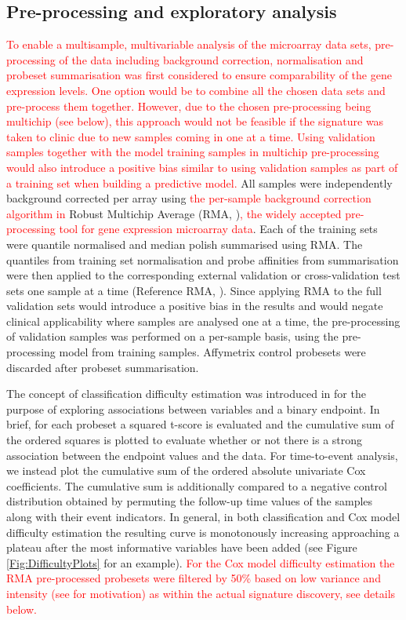 \documentclass[letterpaper,12pt]{article}
\begin{document}
\subsection{Pre-processing and exploratory analysis}
\textcolor{red}{To enable a multisample, multivariable analysis of the microarray data sets, pre-processing of the data including background correction, normalisation and probeset summarisation was first considered to ensure comparability of the gene expression levels. One option would be to combine all the chosen data sets and pre-process them together. However, due to the chosen pre-processing being multichip (see below), this approach would not be feasible if the signature was taken to clinic due to new samples coming in one at a time. Using validation samples together with the model training samples in multichip pre-processing would also introduce a positive bias similar to using validation samples as part of a training set when building a predictive model.}
All samples were independently background corrected per array using \textcolor{red}{the per-sample background correction algorithm in} Robust Multichip Average (RMA, \citet{Bolstad:03})\textcolor{red}{, the widely accepted pre-processing tool for gene expression microarray data}. Each of the training sets were quantile normalised and median polish summarised using RMA. The quantiles from training set normalisation and probe affinities from summarisation were then applied to the corresponding external validation or cross-validation test sets one sample at a time (Reference RMA, \citet{Katz:06}). Since applying RMA to the full validation sets would introduce a positive bias in the results and would negate clinical applicability where samples are analysed one at a time, the pre-processing of validation samples was performed on a per-sample basis, using the pre-processing model from training samples. Affymetrix control probesets were discarded after probeset summarisation. 

The concept of classification difficulty estimation was introduced in \citet{Popovici:10} for the purpose of exploring associations between variables and a binary endpoint. In brief, for each probeset a squared t-score is evaluated and the cumulative sum of the ordered squares is plotted to evaluate whether or not there is a strong association between the endpoint values and the data. For time-to-event analysis, we instead plot the cumulative sum of the ordered absolute univariate Cox coefficients. The cumulative sum is additionally compared to a negative control distribution obtained by permuting the follow-up time values of the samples along with their event indicators. In general, in both classification and Cox model difficulty estimation the resulting curve is monotonously increasing approaching a plateau after the most informative variables have been added (see Figure \ref{Fig:DifficultyPlots} for an example). \textcolor{red}{For the Cox model difficulty estimation the RMA pre-processed probesets were filtered by 50\% based on low variance and intensity (see \cite{Hackstadt:09} for motivation) as within the actual signature discovery, see details below.}
\end{document}
